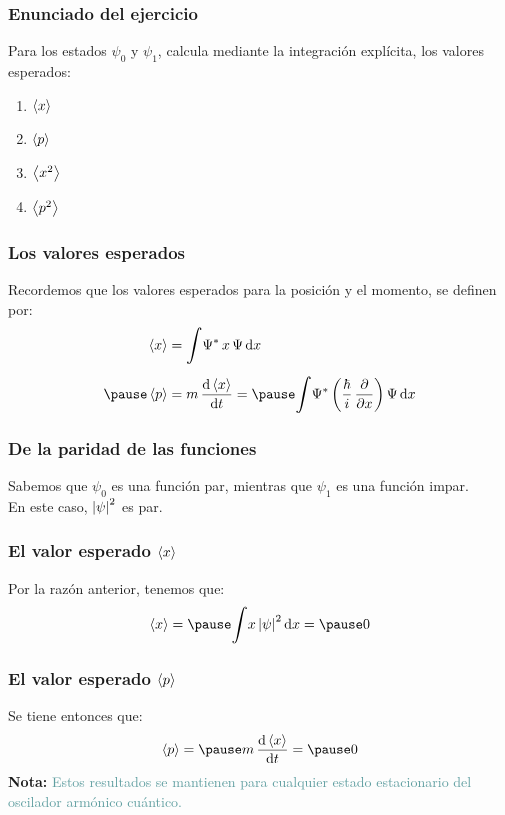 \documentclass[12pt]{beamer}
\begin{document}
\begin{frame}
\frametitle{Enunciado del ejercicio}
Para los estados $\psi_{0}$ y $\psi_{1}$, calcula mediante la integración explícita, los valores esperados:
\pause
{}
\begin{enumerate}[<+->]
\item $\expval{x}$
\item $\expval{p}$
\item $\expval{x^{2}}$
\item $\expval{p^{2}}$
\end{enumerate}
\end{frame}
\begin{frame}
\frametitle{Los valores esperados}
Recordemos que los valores esperados para la posición y el momento, se definen por:
\pause
\begin{eqnarray*}
\begin{aligned}
\expval{x} &= \scaleint{6ex} \Psi^{*} \, x \, \Psi \dd{x} \\[0.5em] \pause
\expval{p} &= m \, \dv{\expval{x}}{t} = \pause \scaleint{6ex} \Psi^{*} \, \bigg( \dfrac{\hbar}{i} \, \pdv{x} \bigg) \, \Psi \dd{x}
\end{aligned}
\end{eqnarray*}
\end{frame}
\begin{frame}
\frametitle{De la paridad de las funciones}
Sabemos que $\psi_{0}$ es una función par, \pause mientras que $\psi_{1}$ es una función impar.
\\
\bigskip
\pause
En este caso, \pause $\abs{\psi}^{2}$ es par.
\end{frame}
\begin{frame}
\frametitle{El valor esperado $\expval{x}$}
Por la razón anterior, tenemos que:
\pause
\begin{eqnarray*}
\expval{x} = \pause \scaleint{6ex} x \, \abs{\psi}^{2} \dd{x} = \pause 0
\end{eqnarray*}
\end{frame}
\begin{frame}
\frametitle{El valor esperado $\expval{p}$}
Se tiene entonces que:
\pause
\begin{eqnarray*}
\expval{p} = \pause m \, \dv{\expval{x}}{t} = \pause 0
\end{eqnarray*}
\pause
\textbf{Nota: } \textcolor{cadetblue}{Estos resultados se mantienen para cualquier estado estacionario del oscilador armónico cuántico.}
\end{frame}
\end{document}
